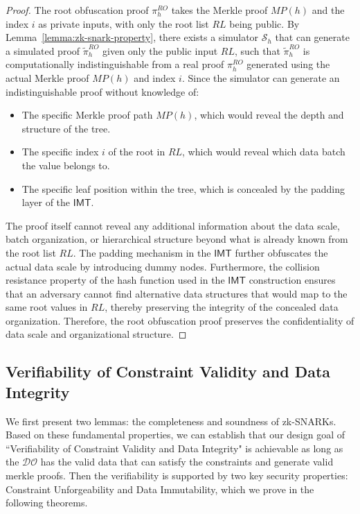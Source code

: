 \documentclass[journal]{IEEEtran}
\begin{document}
\begin{proof}
The root obfuscation proof $\pi_{h}^{RO}$ takes the Merkle proof $MP(h)$ and the index $i$ as private inputs, with only the root list $RL$ being public. By Lemma~\ref{lemma:zk-snark-property}, there exists a simulator $\mathcal{S}_h$ that can generate a simulated proof $\tilde{\pi}_{h}^{RO}$ given only the public input $RL$, such that $\tilde{\pi}_{h}^{RO}$ is computationally indistinguishable from a real proof $\pi_{h}^{RO}$ generated using the actual Merkle proof $MP(h)$ and index $i$.
Since the simulator can generate an indistinguishable proof without knowledge of:
\begin{itemize}
    \item The specific Merkle proof path $MP(h)$, which would reveal the depth and structure of the tree.
    \item The specific index $i$ of the root in $RL$, which would reveal which data batch the value belongs to.
    \item The specific leaf position within the tree, which is concealed by the padding layer of the $\mathsf{IMT}$.
\end{itemize}
The proof itself cannot reveal any additional information about the data scale, batch organization, or hierarchical structure beyond what is already known from the root list $RL$. The padding mechanism in the $\mathsf{IMT}$ further obfuscates the actual data scale by introducing dummy nodes. Furthermore, the collision resistance property of the hash function used in the $\mathsf{IMT}$ construction ensures that an adversary cannot find alternative data structures that would map to the same root values in $RL$, thereby preserving the integrity of the concealed data organization. Therefore, the root obfuscation proof preserves the confidentiality of data scale and organizational structure.
\end{proof}

\subsection{Verifiability of Constraint Validity and Data Integrity}
We first present two lemmas: the completeness and soundness of zk-SNARKs. Based on these fundamental properties, we can establish that our design goal of ``Verifiability of Constraint Validity and Data Integrity" is achievable as long as the $\mathcal{DO}$ has the valid data that can satisfy the constraints and generate valid merkle proofs. Then the verifiability is supported by two key security properties: Constraint Unforgeability and Data Immutability, which we prove in the following theorems.
\end{document}
